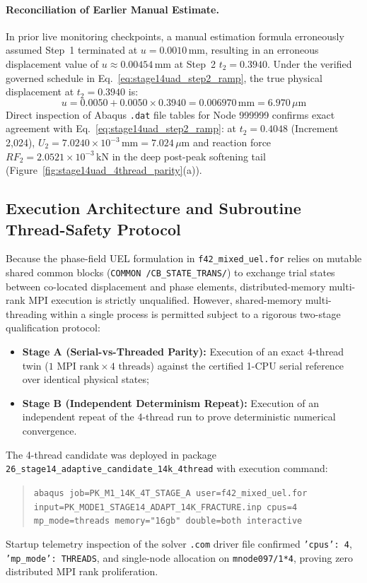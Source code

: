 \paragraph{Reconciliation of Earlier Manual Estimate.}
In prior live monitoring checkpoints, a manual estimation formula erroneously assumed Step~1 terminated at $u = 0.0010\,\mathrm{mm}$, resulting in an erroneous displacement value of $u \approx 0.00454\,\mathrm{mm}$ at Step~2 $t_2 = 0.3940$. Under the verified governed schedule in Eq.~\eqref{eq:stage14uad_step2_ramp}, the true physical displacement at $t_2 = 0.3940$ is:
\begin{equation}
  u = 0.0050 + 0.0050 \times 0.3940 = 0.006970\,\mathrm{mm} = 6.970\,\mu\mathrm{m}
\end{equation}
Direct inspection of Abaqus \texttt{.dat} file tables for Node 999999 confirms exact agreement with Eq.~\eqref{eq:stage14uad_step2_ramp}: at $t_2 = 0.4048$ (Increment 2,024), $U_2 = 7.0240 \times 10^{-3}\,\mathrm{mm} = 7.024\,\mu\mathrm{m}$ and reaction force $RF_2 = 2.0521 \times 10^{-3}\,\mathrm{kN}$ in the deep post-peak softening tail (Figure~\ref{fig:stage14uad_4thread_parity}(a)).

\subsection{Execution Architecture and Subroutine Thread-Safety Protocol}
\label{subsec:stage14uad_architecture}

Because the phase-field UEL formulation in \texttt{f42\_mixed\_uel.for} relies on mutable shared common blocks (\texttt{COMMON /CB\_STATE\_TRANS/}) to exchange trial states between co-located displacement and phase elements, distributed-memory multi-rank MPI execution is strictly unqualified. However, shared-memory multi-threading within a single process is permitted subject to a rigorous two-stage qualification protocol:
\begin{itemize}
  \item \textbf{Stage A (Serial-vs-Threaded Parity):} Execution of an exact 4-thread twin ($1\text{ MPI rank} \times 4\text{ threads}$) against the certified 1-CPU serial reference over identical physical states;
  \item \textbf{Stage B (Independent Determinism Repeat):} Execution of an independent repeat of the 4-thread run to prove deterministic numerical convergence.
\end{itemize}

The 4-thread candidate was deployed in package \texttt{26\_stage14\_adaptive\_candidate\_14k\_4thread} with execution command:
\begin{quote}
  \texttt{abaqus job=PK\_M1\_14K\_4T\_STAGE\_A user=f42\_mixed\_uel.for input=PK\_MODE1\_STAGE14\_ADAPT\_14K\_FRACTURE.inp cpus=4 mp\_mode=threads memory="16gb" double=both interactive}
\end{quote}
Startup telemetry inspection of the solver \texttt{.com} driver file confirmed \texttt{'cpus': 4}, \texttt{'mp\_mode': THREADS}, and single-node allocation on \texttt{mnode097/1*4}, proving zero distributed MPI rank proliferation.

